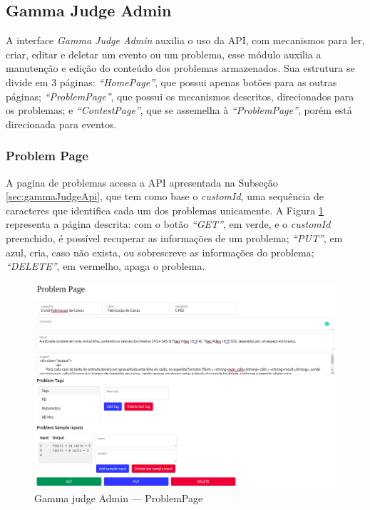 \subsection{Gamma Judge Admin}
\label{sec:gamaJudgeAdmin}

A interface \textit{Gamma Judge Admin} auxilia o uso da API, com mecanismos para ler, criar, editar e deletar um evento ou um problema, esse módulo auxilia a manutenção e edição do conteúdo dos problemas armazenados. Sua estrutura se divide em 3 páginas:\textit{ “HomePage”}, que possui apenas botões para as outras páginas; \textit{``ProblemPage''}, que possui os mecanismos descritos, direcionados para os problemas; e \textit{``ContestPage''}, que se assemelha à \textit{``ProblemPage''}, porém está direcionada para eventos.

\subsubsection{Problem Page}

A pagina de problemas acessa a API apresentada na Subseção \ref{sec:gammaJudgeApi}, que tem como base o \textit{customId}, uma sequência de caracteres que identifica cada um dos problemas unicamente. A Figura \ref{fig:judge_admin_problem} representa a página descrita: com o botão \textit{``GET''}, em verde, e o \textit{customId} preenchido, é possível recuperar as informações de um problema; \textit{``PUT''}, em azul, cria, caso não exista, ou sobrescreve as informações do problema; \textit{``DELETE''}, em vermelho, apaga o problema.

\begin{figure}[H]
    \centering
    \includegraphics[keepaspectratio=true,scale=0.32]{figuras/problem_page.png}
    \caption{Gamma judge Admin — ProblemPage}
    \label{fig:judge_admin_problem}
\end{figure}

